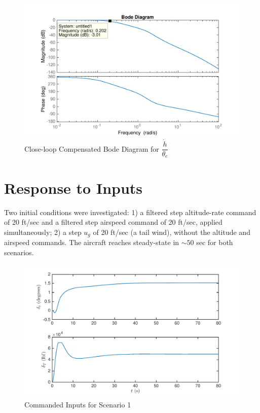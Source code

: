 \documentclass[11pt]{article}
\begin{document}
\begin{figure}[h!]
\begin{center}
\includegraphics[height=.4\textheight]{figures/close_comp_hdot}
\caption{Close-loop Compensated Bode Diagram for $\dfrac{\dot{h}}{\theta_e}$}
\end{center}
\end{figure}

\clearpage
\section{Response to Inputs}
Two initial conditions were investigated: 
1) a filtered step altitude-rate command of 20 ft/sec and a filtered step airspeed command of 20 ft/sec, applied simultaneously; 
2) a step $u_g$ of 20 ft/sec (a tail wind), without the altitude and airspeed commands. The aircraft reaches steady-state in $\sim50$ sec for both scenarios.

\begin{figure}[h!]
\begin{center}
\includegraphics[height=.35\textheight]{figures/inputs1}
\caption{Commanded Inputs for Scenario 1}
\end{center}
\end{figure}
\end{document}
